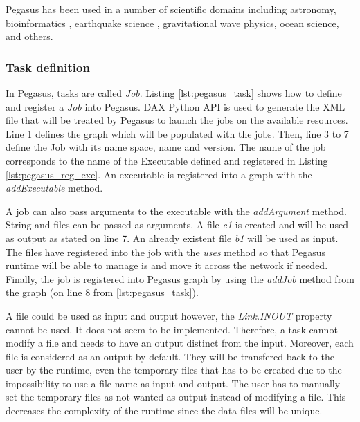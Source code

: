 Pegasus has been used in a number of scientific domains including astronomy, bioinformatics \cite{PRBBF2016}, earthquake science , gravitational wave physics, ocean science, and others.

\subsubsection{Task definition}
In Pegasus, tasks are called \textit{Job}.
Listing \ref{lst:pegasus_task} shows how to define and register a \textit{Job} into Pegasus.
DAX Python API is used to generate the XML file that will be treated by Pegasus to launch the jobs on the available resources.
Line 1 defines the graph which will be populated with the jobs.
Then, line 3 to 7 define the Job with its name space, name and version.
The name of the job corresponds to the name of the Executable defined and registered in Listing \ref{lst:pegasus_reg_exe}.
An executable is registered into a graph with the \textit{addExecutable} method.

\begin{figure}[h]

\end{figure}

A job can also pass arguments to the executable with the \textit{addArgument} method.
String and files can be passed as arguments.
A file \textit{c1} is created and will be used as output as stated on line 7.
An already existent file \textit{b1} will be used as input.
The files have registered into the job with the \textit{uses} method so that Pegasus runtime will be able to manage is and move it across the network if needed.
Finally, the job is registered into Pegasus graph by using the \textit{addJob} method from the graph (on line 8 from \ref{lst:pegasus_task}).

A file could be used as input and output however, the \textit{Link.INOUT} property cannot be used.
It does not seem to be implemented.
Therefore, a task cannot modify a file and needs to have an output distinct from the input.
Moreover, each file is considered as an output by default.
They will be transfered back to the user by the runtime, even the temporary files that has to be created due to the impossibility to use a file name as input and output.
The user has to manually set the temporary files as not wanted as output instead of modifying a file.
This decreases the complexity of the runtime since the data files will be unique.

